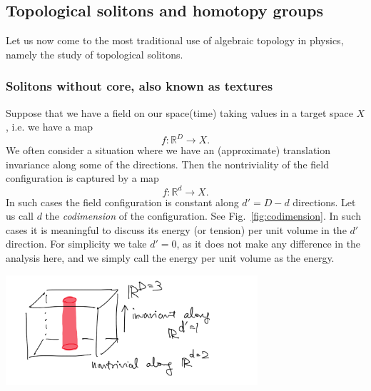 \documentclass[12pt]{article}
\numberwithin{equation}{section}
\numberwithin{figure}{section}
\theoremstyle{remark}
\renewenvironment{figure}[1][]{
  \begin{originalfigure}[#1]
    \begin{mdframed}[linecolor=black!0,backgroundcolor=black!1]
}{
    \end{mdframed}
  \end{originalfigure}
}
\def\bR{\mathbb{R}}
\begin{document}
\subsection{Topological solitons and homotopy groups}




Let us now come to the most traditional use of algebraic topology in physics, 
namely the study of topological solitons. 

\subsubsection{Solitons without core, also known as textures}
Suppose that we have a field on our space(time) taking values in a target space $X$,
i.e. we have a map \begin{equation}
f:\bR^D \to X.
\end{equation}
We often consider a situation where we have an (approximate) translation invariance along 
some of the directions.
Then the nontriviality of the field configuration is captured by a map 
\begin{equation}
f:\bR^d \to X.
\end{equation}
In such cases the field configuration is constant along $d'=D-d$ directions.
Let us call $d$ the \emph{codimension} of the configuration.
See Fig.~\ref{fig:codimension}.
In such cases it is meaningful to discuss its energy (or tension) per unit volume in the $d'$ direction.
For simplicity we take $d'=0$, as it does not make any difference in the analysis here,
and we simply call the energy per unit volume as the energy.

\begin{figure}[h]
\centering
  \includegraphics[width=0.7\textwidth]{codimension.png}
  \caption{A codimension-2 object in $\bR^3$ is string-like. }
  \label{fig:codimension}
\end{figure}
\end{document}
